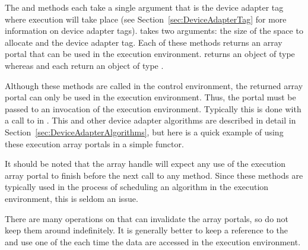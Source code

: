 The  and  methods
each take a single argument that is the device adapter tag where execution
will take place (see Section~\ref{sec:DeviceAdapterTag} for more
information on device adapter tags).  takes two
arguments: the size of the space to allocate and the device adapter tag.
Each of these methods returns an array portal that can be used in the
execution environment.  returns an object of type
whereas  and  each
return an object of type
.

Although these  methods are called in the control
environment, the returned array portal can only be used in the execution
environment. Thus, the portal must be passed to an invocation of the
execution environment. Typically this is done with a call to
 in . This and other
device adapter algorithms are described in detail in
Section~\ref{sec:DeviceAdapterAlgorithms}, but here is a quick example of
using these execution array portals in a simple functor.


It should be noted that the array handle will expect any use of the
execution array portal to finish before the next call to any
 method. Since these  methods
are typically used in the process of scheduling an algorithm in the
execution environment, this is seldom an issue.

\begin{commonerrors}
  There are many operations on  that can
  invalidate the array portals, so do not keep them around indefinitely. It
  is generally better to keep a reference to the
   and use one of the  each
  time the data are accessed in the execution environment.
\end{commonerrors}


